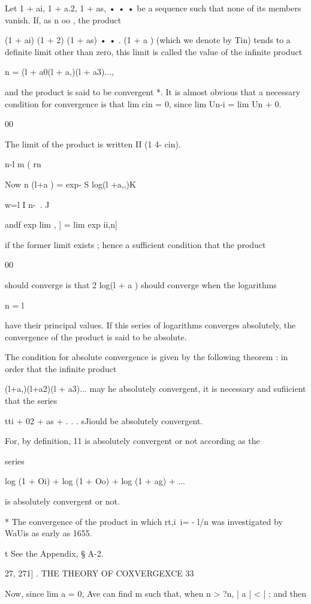 Let 1 + ai, 1 + a.2, 1 + as, • • • be a sequence such that none of its
members vanish. If, as n oo , the product

(1 + ai) (1 + 2) (1 + as) • • . (1 + a ) (which we denote by Tin)
tends to a definite limit other than zero, this limit is called the
value of the infinite product

n = (l + a0(l + a,)(l + a3)...,

and the product is said to be convergent *. It is almost obvious that
a necessary condition for convergence is that lim cin = 0, since lim
Un-i = lim Un + 0.

00

The limit of the product is written II (1 4- cin).

n-l m ( rn \

Now n (l+a ) = exp- S log(l +a,,)K

w=l I n-\ . J

andf exp lim , ] = lim exp ii,n]

if the former limit exists ; hence a sufficient condition that the
product

00

should converge is that 2 log(l + a ) should converge when the
logarithms

n = l

have their principal values. If this series of logarithms converges
absolutely, the convergence of the product is said to be absolute.

The condition for absolute convergence is given by the following
theorem : in order that the infinite product

(l+a,)(l+a2)(l + a3)... may he absolutely convergent, it is necessary
and sufiicient that the series

tti + 02 + as + . . . sJiould be absolutely convergent.

For, by definition, 11 is absolutely convergent or not according as
the

series

log (1 + Oi) + log (1 + Oo) + log (1 + ag) + ...

is absolutely convergent or not.

* The convergence of the product in which rt,i\ i= - l/n was
investigated by WaUis as early as 1655.

t See the Appendix, § A-2.



27, 271] . THE THEORY OF COXVERGEXCE 33

Now, since lim a = 0, Ave can find m such that, when n > ?n, | a | < |
; and then



